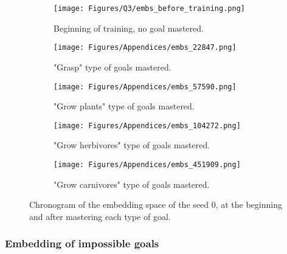 \begin{figure}[H]
    \centering
    \begin{subfigure}[t]{\linewidth}
        \centering
        \texttt{[image: Figures/Q3/embs\_before\_training.png]}
        \caption{Beginning of training, no goal mastered.}
        \label{fig:begining_training}
    \end{subfigure}
    \begin{subfigure}[t]{\linewidth}
        \centering
        \texttt{[image: Figures/Appendices/embs\_22847.png]}
        \caption{"Grasp" type of goals mastered.}
        \label{fig:grasp_mastered}
    \end{subfigure}
    \begin{subfigure}[t]{\linewidth}
        \centering
        \texttt{[image: Figures/Appendices/embs\_57590.png]}
        \caption{"Grow plants" type of goals mastered.}
        \label{fig:grow_plant_mastered}
    \end{subfigure}  
    \begin{subfigure}[t]{\linewidth}
        \centering
        \texttt{[image: Figures/Appendices/embs\_104272.png]}
        \caption{"Grow herbivores" type of goals mastered.}
        \label{fig:grow_herbivore_mastered}
    \end{subfigure}
    \begin{subfigure}[t]{\linewidth}
        \centering
        \texttt{[image: Figures/Appendices/embs\_451909.png]}
        \caption{"Grow carnivores" type of goals mastered.}
        \label{fig:grow_carnivore_mastered}
    \end{subfigure}  
    \caption{Chronogram of the embedding space of the seed $0$, at the beginning and after mastering each type of goal.}
    \label{fig:chronogram_embedding_seed_0}
\end{figure}

\subsubsection{Embedding of impossible goals}
\label{app:embedding_impossible}

